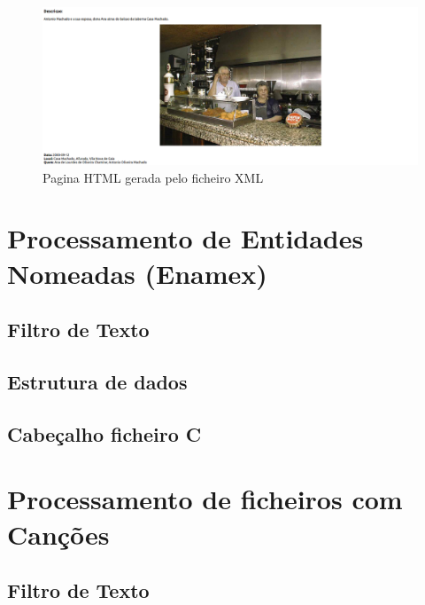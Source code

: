 \label{seq:anex-museu-test-out04-03}


\begin{figure}[H]
\centering
\includegraphics[width=15cm]{anexos/2-1/Exemplo4/Screenshots/pag2_2.png}
\caption{Pagina HTML gerada pelo ficheiro XML}
\end{figure}

\section{Processamento de Entidades Nomeadas (Enamex)}
\label{seq:anex-enamex}

\subsection{Filtro de Texto}
\label{seq:anex-enamex-filtro}


\subsection{Estrutura de dados}
\label{seq:anex-enamex-est}


\subsection{Cabeçalho ficheiro C}
\label{seq:anex-enamex-header}


\section{Processamento de ficheiros com Canções}
\label{seq:anex-music}

\subsection{Filtro de Texto}
\label{seq:anex-music-filtro}


